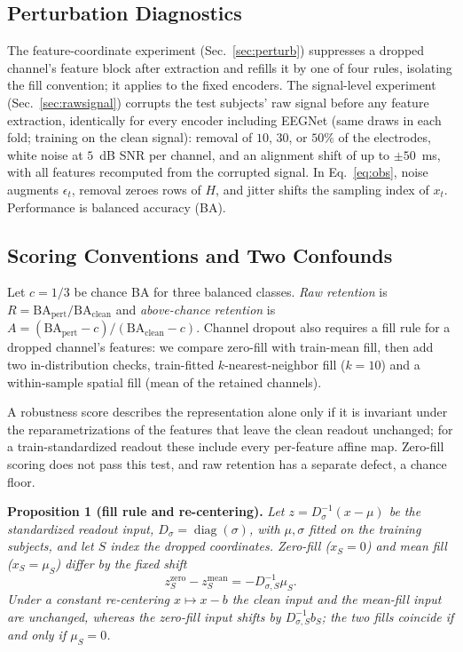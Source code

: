 \documentclass[conference]{IEEEtran}
\begin{document}
\subsection{Perturbation Diagnostics}
The feature-coordinate experiment (Sec.~\ref{sec:perturb}) suppresses a dropped channel's feature block after extraction and refills it by one of four rules, isolating the fill convention; it applies to the fixed encoders. The signal-level experiment (Sec.~\ref{sec:rawsignal}) corrupts the test subjects' raw signal before any feature extraction, identically for every encoder including EEGNet (same draws in each fold; training on the clean signal): removal of $10$, $30$, or $50\%$ of the electrodes, white noise at $5$~dB SNR per channel, and an alignment shift of up to $\pm50$~ms, with all features recomputed from the corrupted signal. In Eq.~\eqref{eq:obs}, noise augments $\epsilon_t$, removal zeroes rows of $H$, and jitter shifts the sampling index of $x_t$. Performance is balanced accuracy (BA).

\subsection{Scoring Conventions and Two Confounds}
\label{sec:confound}
Let $c=1/3$ be chance BA for three balanced classes. \emph{Raw retention} is $R=\mathrm{BA}_{\mathrm{pert}}/\mathrm{BA}_{\mathrm{clean}}$ and \emph{above-chance retention} is $A=(\mathrm{BA}_{\mathrm{pert}}-c)/(\mathrm{BA}_{\mathrm{clean}}-c)$. Channel dropout also requires a fill rule for a dropped channel's features: we compare zero-fill with train-mean fill, then add two in-distribution checks, train-fitted $k$-nearest-neighbor fill ($k{=}10$) and a within-sample spatial fill (mean of the retained channels).

A robustness score describes the representation alone only if it is invariant under the reparametrizations of the features that leave the clean readout unchanged; for a train-standardized readout these include every per-feature affine map. Zero-fill scoring does not pass this test, and raw retention has a separate defect, a chance floor.

\noindent\textbf{Proposition 1 (fill rule and re-centering).} \emph{Let $z=D_\sigma^{-1}(x-\mu)$ be the standardized readout input, $D_\sigma=\operatorname{diag}(\sigma)$, with $\mu,\sigma$ fitted on the training subjects, and let $S$ index the dropped coordinates. Zero-fill ($x_S=0$) and mean fill ($x_S=\mu_S$) differ by the fixed shift}
\begin{equation}\label{eq:noninv}
z_S^{\mathrm{zero}}-z_S^{\mathrm{mean}}=-D_{\sigma,S}^{-1}\mu_S .
\end{equation}
\emph{Under a constant re-centering $x\mapsto x-b$ the clean input and the mean-fill input are unchanged, whereas the zero-fill input shifts by $D_{\sigma,S}^{-1}b_S$; the two fills coincide if and only if $\mu_S=0$.}
\end{document}
